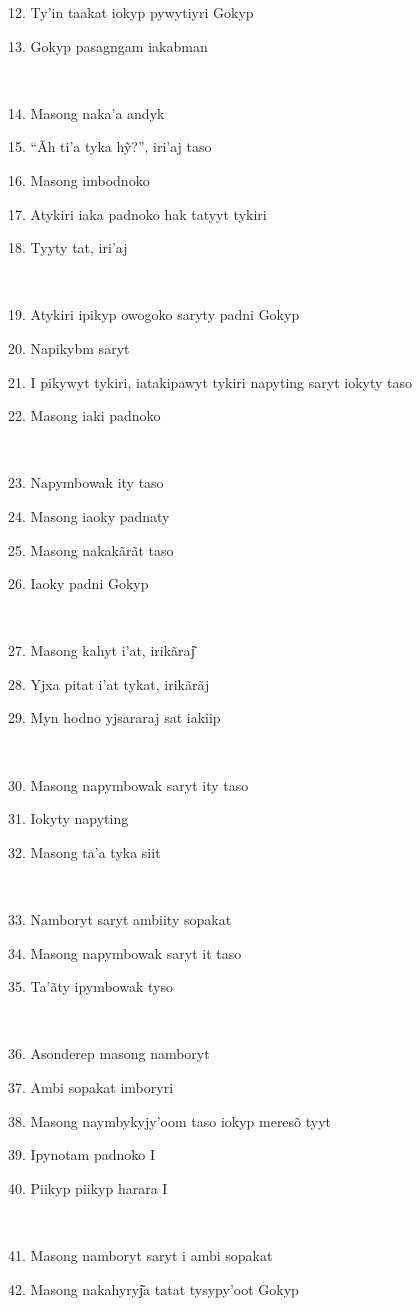 12. Ty'in taakat iokyp pywytiyri Gokyp

13. Gokyp pasagngam iakabman

~

14. Masong naka'a andyk

15. ``Ãh ti'a tyka hỹ?'', iri'aj taso

16. Masong imbodnoko

17. Atykiri iaka padnoko hak tatyyt tykiri

18. Tyyty tat, iri'aj

~

19. Atykiri ipikyp owogoko saryty padni Gokyp

20. Napikybm saryt

21. I pikywyt tykiri, iatakipawyt tykiri napyting saryt iokyty taso

22. Masong iaki padnoko

~

23. Napymbowak ity taso

24. Masong iaoky padnaty

25. Masong nakakãrãt taso

26. Iaoky padni Gokyp

~

27. Masong kahyt i'at, irikãraj͂

28. Yjxa pitat i'at tykat, irikãrãj

29. Myn hodno yjsararaj sat iakiip

~

30. Masong napymbowak saryt ity taso

31. Iokyty napyting

32. Masong ta'a tyka siit

~

33. Namboryt saryt ambiity sopakat

34. Masong napymbowak saryt it taso

35. Ta'ãty ipymbowak tyso

~

36. Asonderep masong namboryt

37. Ambi sopakat imboryri

38. Masong naymbykyjy'oom taso iokyp meresõ tyyt

39. Ipynotam padnoko I

40. Piikyp piikyp harara I

~

41. Masong namboryt saryt i ambi sopakat

42. Masong nakahyryj͂a tatat tysypy'oot Gokyp

